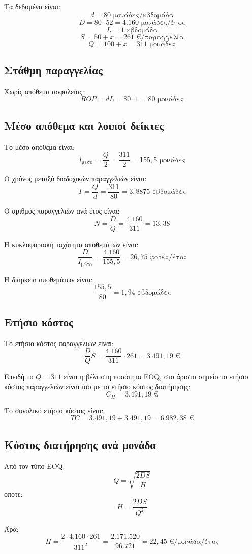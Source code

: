 \documentclass[12pt,a4paper]{article}
\begin{document}
Τα δεδομένα είναι:
\[
d=80 \text{ μονάδες/εβδομάδα}
\]
\[
D=80\cdot52=4.160 \text{ μονάδες/έτος}
\]
\[
L=1 \text{ εβδομάδα}
\]
\[
S=50+x=261 \text{ €/παραγγελία}
\]
\[
Q=100+x=311 \text{ μονάδες}
\]

\subsection{Στάθμη παραγγελίας}

Χωρίς απόθεμα ασφαλείας:
\[
ROP=dL=80\cdot1=80 \text{ μονάδες}
\]

\subsection{Μέσο απόθεμα και λοιποί δείκτες}

Το μέσο απόθεμα είναι:
\[
I_{\text{μέσο}}=\frac{Q}{2}=\frac{311}{2}=155{,}5 \text{ μονάδες}
\]

Ο χρόνος μεταξύ διαδοχικών παραγγελιών είναι:
\[
T=\frac{Q}{d}=\frac{311}{80}=3{,}8875 \text{ εβδομάδες}
\]

Ο αριθμός παραγγελιών ανά έτος είναι:
\[
N=\frac{D}{Q}=\frac{4.160}{311}=13{,}38
\]

Η κυκλοφοριακή ταχύτητα αποθεμάτων είναι:
\[
\frac{D}{I_{\text{μέσο}}}=\frac{4.160}{155{,}5}=26{,}75 \text{ φορές/έτος}
\]

Η διάρκεια αποθεμάτων είναι:
\[
\frac{155{,}5}{80}=1{,}94 \text{ εβδομάδες}
\]

\subsection{Ετήσιο κόστος}

Το ετήσιο κόστος παραγγελιών είναι:
\[
\frac{D}{Q}S=\frac{4.160}{311}\cdot261=3.491{,}19 \text{ €}
\]

Επειδή το \(Q=311\) είναι η βέλτιστη ποσότητα EOQ, στο άριστο σημείο το ετήσιο κόστος παραγγελιών είναι ίσο με το ετήσιο κόστος διατήρησης:
\[
C_H=3.491{,}19 \text{ €}
\]

Το συνολικό ετήσιο κόστος είναι:
\[
TC=3.491{,}19+3.491{,}19=6.982{,}38 \text{ €}
\]

\subsection{Κόστος διατήρησης ανά μονάδα}

Από τον τύπο EOQ:
\[
Q=\sqrt{\frac{2DS}{H}}
\]
οπότε:
\[
H=\frac{2DS}{Q^2}
\]

Άρα:
\[
H=\frac{2\cdot4.160\cdot261}{311^2}
=\frac{2.171.520}{96.721}=22{,}45 \text{ €/μονάδα/έτος}
\]
\end{document}
